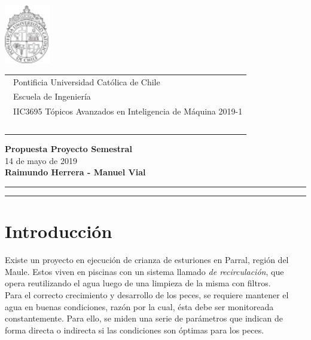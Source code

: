 \documentclass[letterpaper, 12pt]{article}
\begin{document}
\vspace*{-1cm}
\includegraphics[width=2cm]{logo.pdf}
\vspace*{-2cm}

\hspace*{2cm}
 \begin{tabular}{l}
  {\ Pontificia Universidad Católica de Chile}\\
  {\ Escuela de Ingeniería}\\
  {\ IIC3695 Tópicos Avanzados en Inteligencia de Máquina 2019-1 }\\
  {\  }\\
 \end{tabular}
 \hfill 
\vspace*{-0.2cm}
\begin{center}
{\Large\bf Propuesta Proyecto Semestral}\\
\vspace*{3mm}
{14 de mayo de 2019}\\
\vspace*{1mm}
{\bf Raimundo Herrera - Manuel Vial }\\
\vspace*{1mm}
\end{center}
\hrule\vspace*{2pt}\hrule
\thispagestyle{empty}





\section{Introducción}
Existe un proyecto en ejecución de crianza de esturiones en Parral, región del Maule. Estos viven en piscinas con un sistema llamado \textit{de recirculación}, que opera reutilizando el agua luego de una limpieza de la misma con filtros.\\

Para el correcto crecimiento y desarrollo de los peces, se requiere mantener el agua en buenas condiciones, razón por la cual, ésta debe ser monitoreada constantemente. Para ello, se miden una serie de parámetros que indican de forma directa o indirecta si las condiciones son óptimas para los peces.\\
\end{document}
